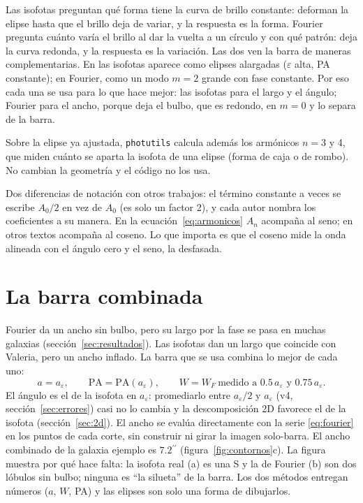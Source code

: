 \documentclass[11pt,a4paper]{article}
\newcommand{\as}{\ensuremath{^{\prime\prime}}}
\newcommand{\aeps}{a_\varepsilon}
\newcommand{\code}[1]{\texttt{#1}}
\begin{document}
Las isofotas preguntan qué forma tiene la curva de brillo constante: deforman la elipse hasta que el brillo
deja de variar, y la respuesta es la forma. Fourier pregunta cuánto varía el brillo al dar la vuelta a un círculo y
con qué patrón: deja la curva redonda, y la respuesta es la variación. Las dos ven la barra de maneras
complementarias. En las isofotas aparece como elipses alargadas ($\varepsilon$ alta, PA constante); en Fourier,
como un modo $m = 2$ grande con fase constante. Por eso cada una se usa para lo que hace mejor: las isofotas para el
largo y el ángulo; Fourier para el ancho, porque deja el bulbo, que es redondo, en $m = 0$ y lo separa de la barra.

Sobre la elipse ya ajustada, \code{photutils} calcula además los armónicos $n = 3$ y 4, que miden cuánto se aparta
la isofota de una elipse (forma de caja o de rombo). No cambian la geometría y el código no los usa.

Dos diferencias de notación con otros trabajos: el término constante a veces se escribe $A_0/2$ en vez de $A_0$
(es solo un factor 2), y cada autor nombra los coeficientes a su manera. En la ecuación~\eqref{eq:armonicos}
$A_n$ acompaña al seno; en otros textos acompaña al coseno. Lo que importa es que el coseno mide la onda alineada
con el ángulo cero y el seno, la desfasada.


\section{La barra combinada}\label{sec:combinada}

Fourier da un ancho sin bulbo, pero su largo por la fase se pasa en muchas galaxias (sección~\ref{sec:resultados}).
Las isofotas dan un largo que coincide con Valeria, pero un ancho inflado. La barra que se usa combina lo mejor de
cada uno:
\begin{equation}\label{eq:comb}
a = \aeps,\qquad \mathrm{PA} = \mathrm{PA}(\aeps),\qquad W = W_F\ \text{medido a } 0.5\,\aeps \text{ y } 0.75\,\aeps .
\end{equation}
El ángulo es el de la isofota en $\aeps$: promediarlo entre $\aeps/2$ y $\aeps$ (v4,
sección~\ref{sec:errores}) casi no lo cambia y la descomposición 2D favorece el de la isofota
(sección~\ref{sec:2d}). El ancho se evalúa directamente con la serie \eqref{eq:fourier} en los puntos de cada
corte, sin construir ni girar la imagen solo-barra. El ancho combinado de la galaxia ejemplo es $7.2\as$
(figura~\ref{fig:contornos}c). La figura muestra por qué hace
falta: la isofota real (a) es una S y la de Fourier (b) son dos lóbulos sin bulbo; ninguna es ``la silueta'' de la
barra. Los dos métodos entregan números ($a$, $W$, PA) y las elipses son solo una forma de dibujarlos.
\end{document}
